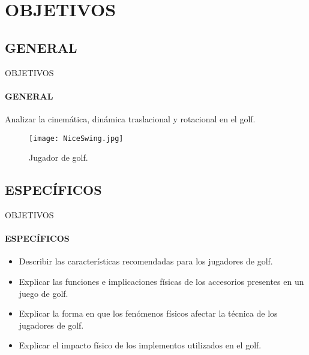 \section{OBJETIVOS}
  \label{obj}
  \subsection{GENERAL}
    \begin{frame}{OBJETIVOS}
      \framesubtitle{GENERAL}
      Analizar la cinemática, dinámica traslacional y rotacional en el golf.
      \begin{figure}[H]
        \centering
        \texttt{[image: NiceSwing.jpg]}
        \caption{Jugador de golf\footnotemark{}.}
      \end{figure}
    \end{frame}

  \subsection{ESPECÍFICOS}
  \begin{frame}{OBJETIVOS}
    \framesubtitle{ESPECÍFICOS}
    \begin{itemize}
      \item Describir las características recomendadas para los jugadores de golf.
      \item Explicar las funciones e implicaciones físicas de los accesorios presentes en un juego de golf.
      \item Explicar la forma en que los fenómenos físicos afectar la técnica de los jugadores de golf.
      \item Explicar el impacto físico de los implementos utilizados en el golf.
    \end{itemize}
    


  \end{frame}